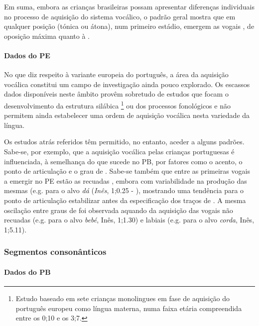\documentclass[output=paper]{LSP/langsci}
\begin{document}
Em suma, embora as crianças brasileiras possam apresentar diferenças individuais no processo de aquisição do sistema vocálico, o padrão geral mostra que em qualquer posição (tónica ou átona), num primeiro estádio, emergem as vogais , de oposição máxima quanto à .

\paragraph*{Dados do PE}

No que diz respeito à variante europeia do português, a área da aquisição vocálica constitui um campo de investigação ainda pouco explorado. Os escassos dados disponíveis neste âmbito provêm sobretudo de estudos que focam o desenvolvimento da estrutura silábica \citep{freitas1997}\footnote{Estudo baseado em sete crianças monolingues em fase de aquisição do português europeu como língua materna, numa faixa etária compreendida entre os 0;10 e os 3;7.} ou dos processos fonológicos \citep{freitas2004,fikkertfreitas2006} e não permitem ainda estabelecer uma ordem de aquisição vocálica nesta variedade da língua.

Os estudos atrás referidos têm permitido, no entanto, aceder a alguns padrões. Sabe-se, por exemplo, que a aquisição vocálica pelas crianças portuguesas é influenciada, à semelhança do que sucede no PB, por fatores como o acento, o ponto de articulação e o grau de . Sabe-se também que entre as primeiras vogais a emergir no PE estão as recuadas \textipa{[a, 5]}, embora com variabilidade na produção das mesmas (e.g. \textipa{[\textprimstress da]/[\textprimstress d5]} para o alvo \textit{dá} (\textit{Inês}, 1;0.25 - \citealt{freitas1997}), mostrando uma tendência para o ponto de articulação estabilizar antes da especificação dos traços de . A mesma oscilação entre graus de  foi observada aquando da aquisição das vogais não recuadas  (e.g. \textipa{[bibi]/[bebe]} para o alvo \textit{bebé}, Inês, 1;1.30) e labiais  (e.g. \textipa{[kO]/[ku]} para o alvo \textit{corda}, Inês, 1;5.11).

\subsubsection{Segmentos consonânticos}
\label{subsubsec:matzenauer_consoantes}

\paragraph*{Dados do PB}
\end{document}
